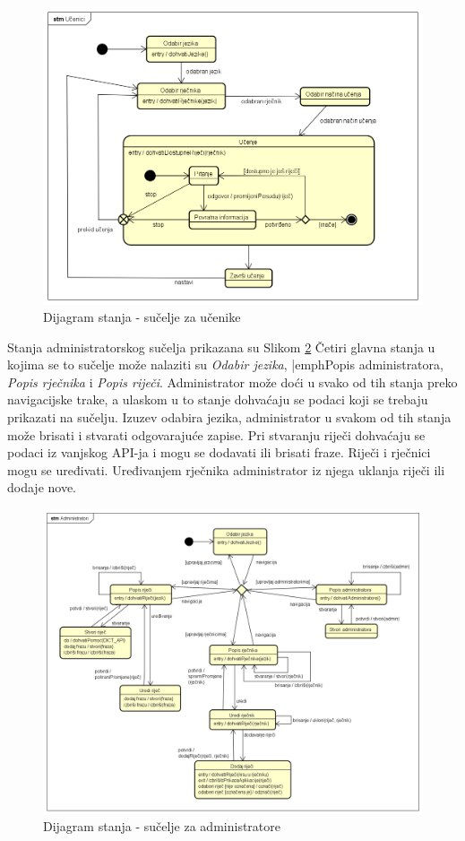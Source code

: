 \begin{figure}[htp]
	\includegraphics[scale=0.5]{dijagrami/state_ucenici.png}
	\centering
	\caption{Dijagram stanja - sučelje za učenike}
	\label{fig:state-ucenici}
	\end{figure}

Stanja administratorskog sučelja prikazana su Slikom \ref{fig:state-admin} Četiri glavna stanja u kojima se to sučelje može nalaziti su  \emph{Odabir jezika}, |emph{Popis administratora}, \emph{Popis rječnika} i \emph{Popis riječi}. Administrator može doći u svako od tih stanja preko navigacijske trake, a ulaskom u to stanje dohvaćaju se podaci koji se trebaju prikazati na sučelju. Izuzev odabira jezika, administrator u svakom od tih stanja može brisati i stvarati odgovarajuće zapise. Pri stvaranju riječi dohvaćaju se podaci iz vanjskog API-ja i mogu se dodavati ili brisati fraze. Riječi i rječnici mogu se uređivati. Uređivanjem rječnika administrator iz njega uklanja riječi ili dodaje nove.


\begin{figure}[htp]
\includegraphics[scale=0.4]{dijagrami/state_administratori.png}
\centering
\caption{Dijagram stanja - sučelje za administratore}
\label{fig:state-admin}
\end{figure}
	
